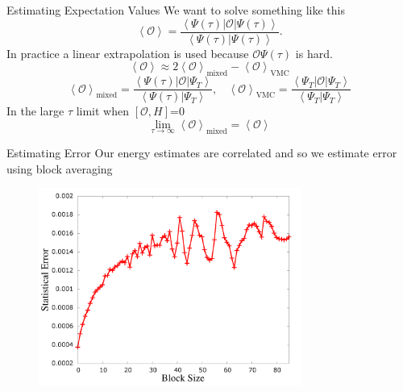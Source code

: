 \documentclass{beamer}
\newcommand{\ket}[1]{\left| #1 \right>}
\newcommand{\bra}[1]{\left< #1 \right|}
\newcommand{\braket}[2]{\left< #1 | #2 \right>}
\begin{document}
\begin{frame}{Estimating Expectation Values}
We want to solve something like this
\begin{equation*}
   \left<\mathcal{O}\right> = \frac{\bra{\Psi(\tau)}\mathcal{O}\ket{\Psi(\tau)}}{\braket{\Psi(\tau)}{\Psi(\tau)}}.
\end{equation*}
In practice a linear extrapolation is used because $\mathcal{O}\Psi(\tau)$ is hard.
\begin{equation*}
   \left<\mathcal{O}\right> \approx 2\left<\mathcal{O}\right>_\text{mixed} - \left<\mathcal{O}\right>_\text{VMC}
\end{equation*}
\begin{equation*}
   \left<\mathcal{O}\right>_\text{mixed} = \frac{\bra{\Psi(\tau)}\mathcal{O}\ket{\Psi_T}}{\braket{\Psi(\tau)}{\Psi_T}},
   ~~~~
   \left<\mathcal{O}\right>_\text{VMC} = \frac{\bra{\Psi_T}\mathcal{O}\ket{\Psi_T}}{\braket{\Psi_T}{\Psi_T}}
\end{equation*}
In the large $\tau$ limit when $\left[\mathcal{O},H\right]$=0
\begin{equation*}
   \lim\limits_{\tau\rightarrow\infty}\left<\mathcal{O}\right>_\text{mixed} = \left<\mathcal{O}\right>
\end{equation*}
\end{frame}

\begin{frame}{Estimating Error}
Our energy estimates are correlated and so we estimate error using block averaging
\begin{figure}
   \includegraphics[width=0.77\textwidth]{../figures/blockaverage.png}
\end{figure}
\end{frame}
\end{document}
